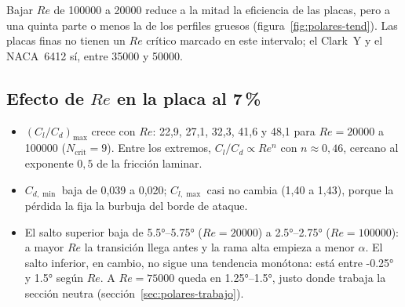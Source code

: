 Bajar $Re$ de \num{100000} a \num{20000} reduce a la mitad la eficiencia de las placas,
pero a una quinta parte o menos la de los perfiles gruesos (figura~\ref{fig:polares-tend}).
Las placas finas no tienen un $Re$ crítico marcado en este intervalo; el Clark~Y y el
NACA~6412 sí, entre \num{35000} y \num{50000}.

\subsection{Efecto de $Re$ en la placa al 7\,\%}
\begin{itemize}
  \item $(C_l/C_d)_{\max}$ crece con $Re$: 22,9, 27,1, 32,3, 41,6 y 48,1 para
        $Re=\num{20000}$ a \num{100000} ($N_{\text{crit}}=9$). Entre los extremos,
        $C_l/C_d\propto Re^{n}$ con $n\approx0{,}46$, cercano al exponente $0{,}5$ de la
        fricción laminar.
  \item $C_{d,\min}$ baja de 0,039 a 0,020; $C_{l,\max}$ casi no cambia (1,40 a 1,43),
        porque la pérdida la fija la burbuja del borde de ataque.
  \item El salto superior baja de \ang{5.5}--\ang{5.75} ($Re=\num{20000}$) a
        \ang{2.5}--\ang{2.75} ($Re=\num{100000}$): a mayor $Re$ la transición llega
        antes y la rama alta empieza a menor $\alpha$. El salto inferior, en cambio, no
        sigue una tendencia monótona: está entre \ang{-0.25} y \ang{1.5} según $Re$. A
        $Re=\num{75000}$ queda en \ang{1.25}--\ang{1.5}, justo donde trabaja la sección
        neutra (sección~\ref{sec:polares-trabajo}).
\end{itemize}

